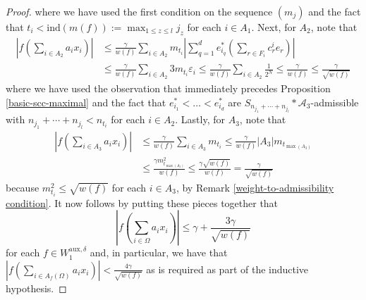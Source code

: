 \documentclass[10pt,a4paper]{amsart}
\newcommand{\bes}{\begin{equation*}}
\newcommand{\ees}{\end{equation*}}
\newcommand{\ep}{\varepsilon}
\begin{document}
\begin{proof}
where we have used the first condition on the sequence $(m_{j})$ and the fact that $t_{i}<\text{ind}(m(f)):=\max_{1\leq z\leq l}j_{z}$ for each $i\in A_{1}$. Next, for $A_{2}$, note that
\begin{align*} \left\vert f\left(\sum_{i\in A_{2}}a_{i}x_{i}\right)\right\vert &\leq \frac{\gamma}{w(f)}\sum_{i\in A_{2}}m_{t_{i}}\left\vert\sum_{q=1}^{d}e^{*}_{i_{q}}\left(\sum_{r\in F_{i}}c^{i}_{r}e_{r}\right) \right\vert \\ &\leq \frac{\gamma}{w(f)}\sum_{i\in A_{2}} 3m_{t_{i}}\ep_{i} \leq\frac{\gamma}{w(f)}\sum_{i\in A_{2}}\frac{1}{2^{N}}\leq\frac{\gamma}{w(f)}\leq\frac{\gamma}{\sqrt{w(f)}} \end{align*}
where we have used the observation that immediately precedes Proposition \ref{basic-scc-maximal} and the fact that $e^{*}_{i_{1}}<\ldots<e^{*}_{i_{d}}$ are $S_{n_{j_{1}}+\cdots+n_{j_{l}}}\ast\mathcal{A}_{3}$-admissible with $n_{j_{1}}+\cdots+n_{j_{l}}<n_{t_{i}}$ for each $i\in A_{2}$. Lastly, for $A_{3}$, note that 
\begin{align*} \left\vert f\left(\sum_{i\in A_{3}}a_{i}x_{i}\right)\right\vert &\leq \frac{\gamma}{w(f)}\sum_{i\in A_{3}}m_{t_{i}} \leq \frac{\gamma}{w(f)}|A_{3}|m_{t_{\max(A_{3})}} \\ &\leq\frac{\gamma m^{2}_{t_{\max(A_{3})}}}{w(f)}\leq \frac{\gamma\sqrt{w(f)}}{w(f)}=\frac{\gamma}{\sqrt{w(f)}}\end{align*}
because $m_{t_{i}}^{2}\leq\sqrt{w(f)}$ for each $i\in A_{3}$, by Remark \ref{weight-to-admissibility condition}. It now follows by putting these pieces together that
\bes \left\vert f\left(\sum_{i\in\Omega}a_{i}x_{i}\right)\right\vert \leq \gamma+\frac{3\gamma}{\sqrt{w(f)}}\ees
for each $f\in W^{\text{aux},\delta}_{1}$ and, in particular, we have that $\left\vert f\left(\sum_{i\in A_{f}(\Omega)}a_{i}x_{i}\right)\right\vert < \frac{4\gamma}{\sqrt{w(f)}}$ as is required as part of the inductive hypothesis.


\end{proof}
\end{document}
